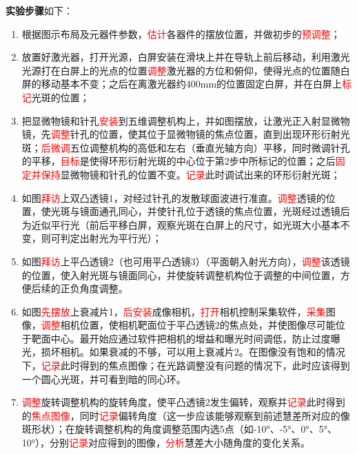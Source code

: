 \documentclass[dvipsnames, svgnames,a4paper,11pt]{article}
\begin{document}
	\textbf{实验步骤}如下：
	\begin{enumerate}
		\item 根据图示布局及元器件参数，\textcolor{red}{估计}各器件的摆放位置，并做初步的\textcolor{red}{预调整}；
		\item 放置好激光器，打开光源，白屏安装在滑块上并在导轨上前后移动，利用激光光源打在白屏上的光点的位置\textcolor{red}{调整}激光器的方位和俯仰，使得光点的位置随白屏的移动基本不变；之后在离激光器约400mm的位置固定白屏，并在白屏上\textcolor{red}{标记}光斑的位置；
		\item 	把显微物镜和针孔\textcolor{red}{安装}到五维调整机构上，并如图摆放，让激光正入射显微物镜，先\textcolor{red}{调整}针孔的位置，使其位于显微物镜的焦点位置，直到出现环形衍射光斑；\textcolor{red}{后微调}五位调整机构的高低和左右（垂直光轴方向）平移，同时微调针孔的平移，\textcolor{red}{目标}是使得环形衍射光斑的中心位于第2步中所标记的位置；之后\textcolor{red}{固定并保持}显微物镜和针孔的位置不变。\textcolor{red}{记录}此时调试出来的环形衍射光斑；
		\item 如图\textcolor{red}{拜访}上双凸透镜1，对经过针孔的发散球面波进行准直。\textcolor{red}{调整}透镜的位置，使光斑与镜面通孔同心，并使针孔位于透镜的焦点位置，光斑经过透镜后为近似平行光（前后平移白屏，观察光斑在白屏上的尺寸，如光斑大小基本不变，则可判定出射光为平行光）；
		\item 如图\textcolor{red}{拜访}上平凸透镜2（也可用平凸透镜3）（平面朝入射光方向），\textcolor{red}{调整}该透镜的位置，使入射光斑与镜面同心，并使旋转调整机构位于调整的中间位置，方便后续的正负角度调整。
		\item 如图\textcolor{red}{先摆放}上衰减片1，\textcolor{red}{后安装}成像相机，\textcolor{red}{打开}相机控制采集软件，\textcolor{red}{采集}图像，\textcolor{red}{调整}相机位置，使相机靶面位于平凸透镜2的焦点处，并使图像尽可能位于靶面中心。最开始应通过软件把相机的增益和曝光时间调低，防止过度曝光，损坏相机。如果衰减的不够，可以用上衰减片2。在图像没有饱和的情况下，\textcolor{red}{记录}此时得到的焦点图像；在光路调整没有问题的情况下，此时应该得到一个圆心光斑，并可看到暗的同心环。
		\item \textcolor{red}{调整}旋转调整机构的旋转角度，使平凸透镜2发生偏转，观察并\textcolor{red}{记录}此时得到的\textcolor{red}{焦点图像}，同时\textcolor{red}{记录}偏转角度（这一步应该能够观察到前述慧差所对应的像斑形状）；在旋转调整机构的角度调整范围内选5点（如-10°、-5°、0°、5°、10°），分别\textcolor{red}{记录}对应得到的图像，\textcolor{red}{分析}慧差大小随角度的变化关系。
	\end{enumerate}
	
\end{document}
